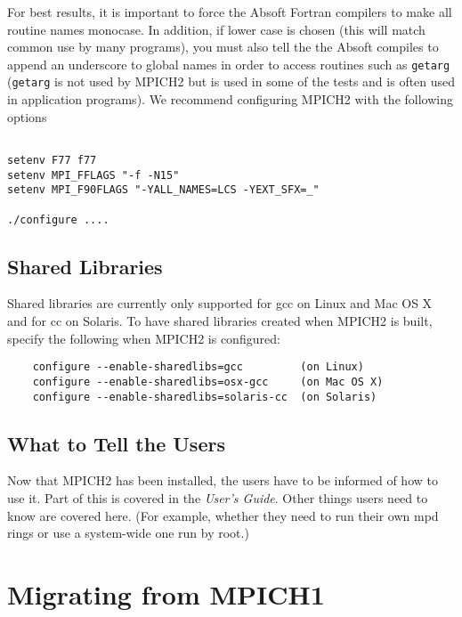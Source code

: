\documentclass[dvipdfm,11pt]{article}
\begin{document}
For best results, it is important to force the Absoft Fortran compilers to 
make all routine names monocase.  In addition, if lower case is chosen 
(this will match common use by many programs), you must also tell the the 
Absoft compiles to append an underscore to global names in order to access 
routines such as \texttt{getarg} (\texttt{getarg} is not used by MPICH2 but is
used in some 
of the tests and is often used in application programs).  We recommend 
configuring MPICH2 with the following options
\begin{verbatim}

setenv F77 f77
setenv MPI_FFLAGS "-f -N15"
setenv MPI_F90FLAGS "-YALL_NAMES=LCS -YEXT_SFX=_"

./configure ....

\end{verbatim}




\subsection{Shared Libraries}
\label{sec:shared-libraries}

Shared libraries are currently only supported for gcc on Linux and
Mac OS X and for cc on Solaris. To have shared libraries created when
MPICH2 is built, specify the following when MPICH2 is configured:
\begin{verbatim}
    configure --enable-sharedlibs=gcc         (on Linux)
    configure --enable-sharedlibs=osx-gcc     (on Mac OS X)
    configure --enable-sharedlibs=solaris-cc  (on Solaris)
\end{verbatim}




\subsection{What to Tell the Users}
\label{sec:telling}

Now that MPICH2 has been installed, the users have to be informed of how
to use it.  Part of this is covered in the \emph{User's Guide}.  Other
things users need to know are covered here.  (For example, whether they need to
run their own mpd rings or use a system-wide one run by root.)


\section{Migrating from MPICH1}
\label{sec:migrating}
\end{document}
